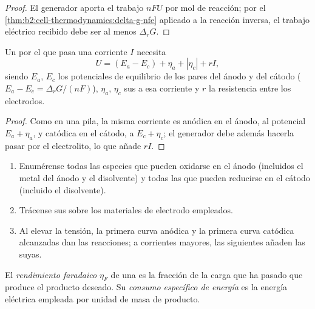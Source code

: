 \begin{proof}
El generador aporta el trabajo $nFU$ por mol de reacción; por el
\cref{thm:b2:cell-thermodynamics:delta-g-nfe} aplicado a la reacción inversa, el
trabajo eléctrico recibido debe ser al menos $\Delta_r G$.
\end{proof}

\begin{proposition}\label{prop:b2:batteries-electrolysis:electrolysis-voltage}
Un  por el que pasa una corriente $I$ necesita
\[
  U = (E_a - E_c) + \eta_a + |\eta_c| + rI ,
\]
siendo $E_a$, $E_c$ los potenciales de equilibrio de los pares del ánodo y del cátodo
($E_a - E_c = \Delta_r G/(nF)$), $\eta_a$, $\eta_c$ sus  a esa
corriente y $r$ la resistencia entre los electrodos.
\end{proposition}

\begin{proof}
Como en una pila, la misma corriente es anódica en el ánodo, al potencial $E_a +
\eta_a$, y catódica en el cátodo, a $E_c + \eta_c$; el generador debe además
hacerla pasar por el electrolito, lo que añade $rI$.
\end{proof}

\begin{method}\label{met:b2:batteries-electrolysis:predict-electrolysis}
\begin{enumerate}
  \item Enumérense todas las especies que pueden oxidarse en el ánodo (incluidos el
        metal del ánodo y el disolvente) y todas las que pueden reducirse en
        el cátodo (incluido el disolvente).
  \item Trácense sus  sobre los materiales de electrodo empleados.
  \item Al elevar la tensión, la primera curva anódica y la primera curva catódica
        alcanzadas dan las reacciones; a corrientes mayores, las siguientes añaden
        las suyas.
\end{enumerate}
\end{method}

\begin{definition}\label{def:b2:batteries-electrolysis:faradaic-efficiency}
El \emph{rendimiento faradaico} $\eta_F$ de una
 es la fracción de la carga que ha pasado que produce el producto
deseado. Su \emph{consumo específico de energía}
es la energía eléctrica empleada por unidad de masa de producto.
\end{definition}

